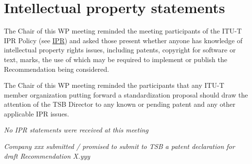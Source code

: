 
\section{Intellectual property statements}\label{intellectual-property-statements}

The Chair of this WP meeting reminded the meeting participants of the ITU-T IPR Policy (see \href{https://www.itu.int/en/ITU-T/ipr/Pages/default.aspx}{IPR}) and asked those present whether anyone has knowledge of intellectual property rights issues, including patents, copyright for software or text, marks, the use of which may be required to implement or publish the Recommendation being considered.

The Chair of this WP meeting reminded the participants that any ITU-T member organization putting forward a standardization proposal should draw the attention of the TSB Director to any known or pending patent and any other applicable IPR issues.

\textit{No IPR statements were received at this meeting}

\textit{Company xxx submitted / promised to submit to TSB a patent declaration for draft Recommendation X.yyy}
